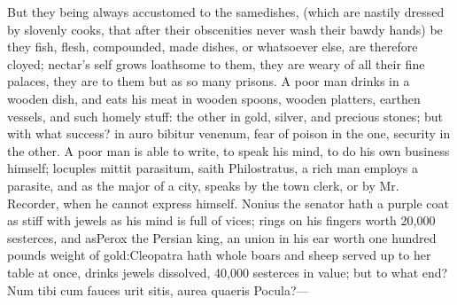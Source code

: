 {But they being always accustomed to the samedishes, (which are
nastily dressed by slovenly cooks, that after their obscenities never
wash their bawdy hands) be they fish, flesh, compounded, made dishes,
or whatsoever else, are therefore cloyed; nectar's self grows loathsome
to them, they are weary of all their fine palaces, they are to them but
as so many prisons. A poor man drinks in a wooden dish, and eats his
meat in wooden spoons, wooden platters, earthen vessels, and such
homely stuff: the other in gold, silver, and precious stones; but with
what success? in auro bibitur venenum, fear of poison in the one,
security in the other. A poor man is able to write, to speak his mind,
to do his own business himself; locuples mittit parasitum, saith
Philostratus, a rich man employs a parasite, and as the major of
a city, speaks by the town clerk, or by Mr. Recorder, when he cannot
express himself. Nonius the senator hath a purple coat as stiff
with jewels as his mind is full of vices; rings on his fingers worth
20,000 sesterces, and asPerox the Persian king, an union in his
ear worth one hundred pounds weight of gold:Cleopatra hath whole
boars and sheep served up to her table at once, drinks jewels
dissolved, 40,000 sesterces in value; but to what end?
Num tibi cum fauces urit sitis, aurea quaeris
Pocula?---

}
